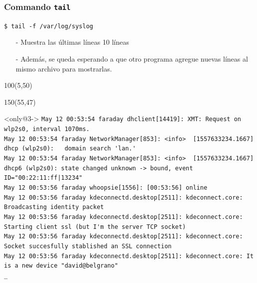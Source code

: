 \documentclass{beamer}
\begin{document}
\begin{frame}[fragile,t]
    \frametitle{Commando \texttt{tail}}
    \begin{block}{\vspace*{-3ex}}
    \texttt{\$}\verb: tail -f /var/log/syslog:
    \vspace*{0.5ex}
    \end{block}
    \begin{itemize}
    \item[-] Muestra las últimas líneas 10 líneas
    \item[-] Además, se queda esperando a que otro programa agregue nuevas líneas al mismo archivo para mostrarlas.
    \end{itemize}
    \begin{textblock}{100}(5,50)
    \begin{center}
    \end{center}
    \end{textblock}
    \begin{textblock}{150}(55,47)
     \vspace{-0.5cm}
    \begin{block}<only@3->{\vspace*{-3ex}}
    \scriptsize
    \verb;May 12 00:53:54 faraday dhclient[14419]: XMT: Request on wlp2s0, interval 1070ms.;\\
    \verb;May 12 00:53:54 faraday NetworkManager[853]: <info>  [1557633234.1667] dhcp (wlp2s0):   domain search 'lan.';\\
    \verb;May 12 00:53:54 faraday NetworkManager[853]: <info>  [1557633234.1667] dhcp6 (wlp2s0): state changed unknown -> bound, event ID="00:22:11:ff|13234";\\
    \verb;May 12 00:53:56 faraday whoopsie[1556]: [00:53:56] online;\\
    \verb;May 12 00:53:56 faraday kdeconnectd.desktop[2511]: kdeconnect.core: Broadcasting identity packet;\\
    \verb;May 12 00:53:56 faraday kdeconnectd.desktop[2511]: kdeconnect.core: Starting client ssl (but I'm the server TCP socket);\\
    \verb;May 12 00:53:56 faraday kdeconnectd.desktop[2511]: kdeconnect.core: Socket succesfully stablished an SSL connection;\\
    \verb;May 12 00:53:56 faraday kdeconnectd.desktop[2511]: kdeconnect.core: It is a new device "david@belgrano";\\
    \verb;_;\\
    \vspace*{0.5ex}
    \end{block}
    \end{textblock}
\end{frame}
\end{document}
